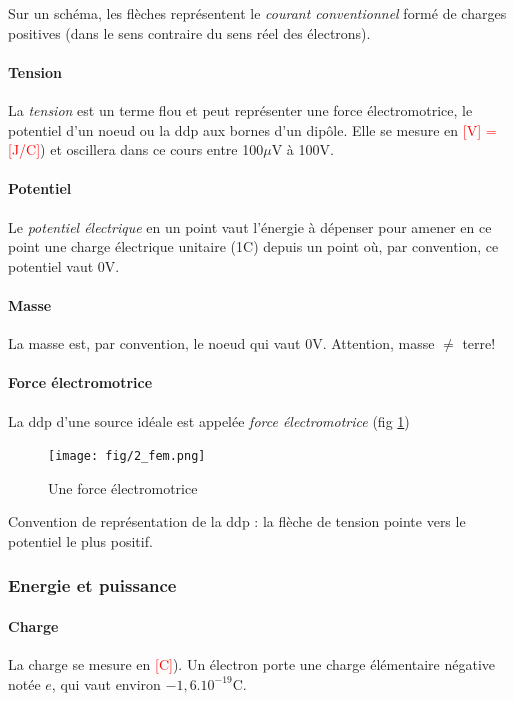 \documentclass[a4paper]{article}
\begin{document}
    Sur un schéma, les flèches représentent le \textit{courant conventionnel} formé
    de charges positives (dans le sens contraire du sens réel des électrons).

    \paragraph{Tension} La \textit{tension} est un terme flou et peut représenter 
    une force électromotrice, le potentiel d'un noeud ou la ddp aux bornes d'un dipôle.
    Elle se mesure en \textcolor{red}{[V] = [J/C]}) et oscillera dans ce cours entre 
    100$\mu$V à 100V.

    \paragraph{Potentiel} Le \textit{potentiel électrique} en un point vaut l'énergie
    à dépenser pour amener en ce point une charge électrique unitaire (1C) depuis
    un point où, par convention, ce potentiel vaut 0V.

    \paragraph{Masse} La masse est, par convention, le noeud qui vaut 0V. Attention, 
    masse $\neq$ terre! 

    \paragraph{Force électromotrice} La ddp d'une source idéale est appelée \textit{force électromotrice} (fig \ref{fig:fem})

    \begin{figure}[H]
        \begin{center}
            \texttt{[image: fig/2\_fem.png]}
            \caption{Une force électromotrice}
            \label{fig:fem}
        \end{center}
    \end{figure}

    Convention de représentation de la ddp : la flèche de tension pointe vers le
    potentiel le plus positif.

    \subsubsection{Energie et puissance}

    \paragraph{Charge} La charge se mesure en \textcolor{red}{[C]}). Un électron
    porte une charge élémentaire négative notée $e$, qui vaut environ $-1,6.10^{-19}$C.
\end{document}
